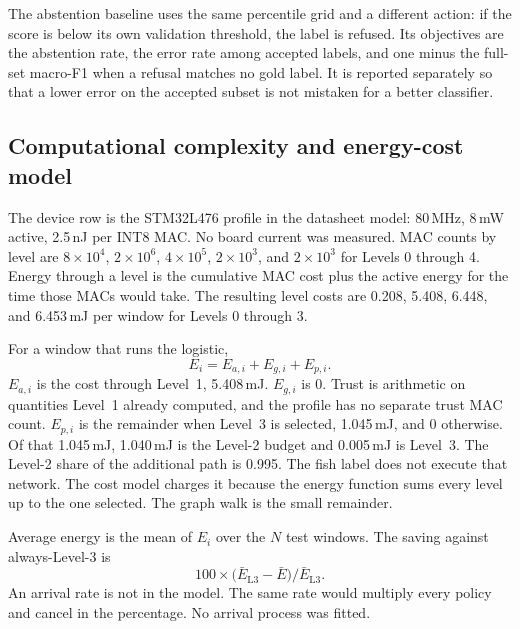 \documentclass[sn-mathphys-num]{sn-jnl}%
\theoremstyle{thmstyleone}%
\theoremstyle{thmstyletwo}%
\theoremstyle{thmstylethree}%
\begin{document}
The abstention baseline uses the same percentile grid and a different action: if the score is below its own validation threshold, the label is refused. Its objectives are the abstention rate, the error rate among accepted labels, and one minus the full-set macro-F1 when a refusal matches no gold label. It is reported separately so that a lower error on the accepted subset is not mistaken for a better classifier.

\subsection{Computational complexity and energy-cost model}\label{sec:energy}

The device row is the STM32L476 profile in the datasheet model: 80\,MHz, 8\,mW active, 2.5\,nJ per INT8 MAC. No board current was measured. MAC counts by level are $8\times 10^{4}$, $2\times 10^{6}$, $4\times 10^{5}$, $2\times 10^{3}$, and $2\times 10^{3}$ for Levels 0 through 4. Energy through a level is the cumulative MAC cost plus the active energy for the time those MACs would take. The resulting level costs are 0.208, 5.408, 6.448, and 6.453\,mJ per window for Levels 0 through 3.

For a window that runs the logistic,
\begin{equation}
E_i = E_{a,i} + E_{g,i} + E_{p,i}.
\label{eq:energy}
\end{equation}
$E_{a,i}$ is the cost through Level~1, 5.408\,mJ. $E_{g,i}$ is 0. Trust is arithmetic on quantities Level~1 already computed, and the profile has no separate trust MAC count. $E_{p,i}$ is the remainder when Level~3 is selected, 1.045\,mJ, and 0 otherwise. Of that 1.045\,mJ, 1.040\,mJ is the Level-2 budget and 0.005\,mJ is Level~3. The Level-2 share of the additional path is 0.995. The fish label does not execute that network. The cost model charges it because the energy function sums every level up to the one selected. The graph walk is the small remainder.

Average energy is the mean of $E_i$ over the $N$ test windows. The saving against always-Level-3 is
\begin{equation}
100 \times \bigl(\bar{E}_{\mathrm{L3}} - \bar{E}\bigr) / \bar{E}_{\mathrm{L3}}.
\label{eq:saving}
\end{equation}
An arrival rate is not in the model. The same rate would multiply every policy and cancel in the percentage. No arrival process was fitted.
\end{document}
